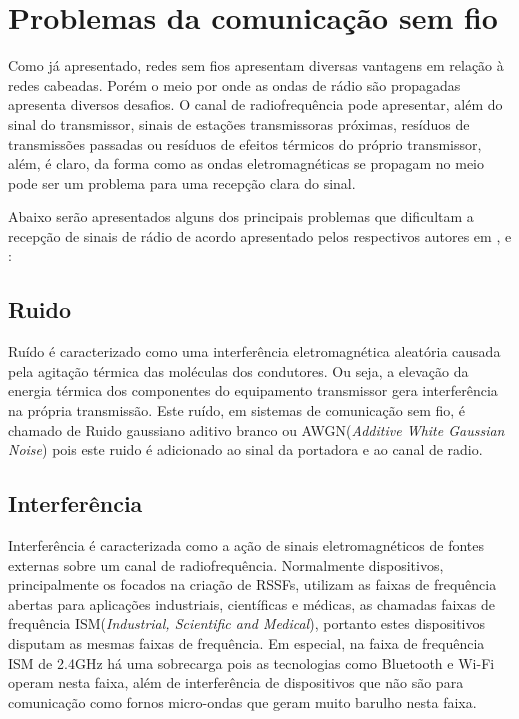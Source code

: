 \section{Problemas da comunicação sem fio}
Como já apresentado, redes sem fios apresentam diversas vantagens em relação à redes cabeadas. Porém o meio por onde as ondas de rádio são propagadas apresenta diversos desafios. O canal de radiofrequência pode apresentar, além do sinal do transmissor, sinais de estações transmissoras próximas, resíduos de transmissões passadas ou resíduos de efeitos térmicos do próprio transmissor, além, é claro, da forma como as ondas eletromagnéticas se propagam no meio pode ser um problema para uma recepção clara do sinal.

Abaixo serão apresentados alguns dos principais problemas que dificultam a recepção de sinais de rádio de acordo apresentado pelos respectivos autores em \cite{gomes2017estimaccao}, \cite{rappaport2009} e \cite{rochol2018sistemas}:
\subsection*{Ruido}
Ruído é caracterizado como uma interferência eletromagnética aleatória causada pela agitação térmica das moléculas dos condutores. Ou seja, a elevação da energia térmica dos componentes do equipamento transmissor gera interferência na própria transmissão. Este ruído, em sistemas de comunicação sem fio, é chamado de Ruido gaussiano aditivo branco ou AWGN(\emph{Additive White Gaussian Noise}) pois este ruido é adicionado ao sinal da portadora e ao canal de radio.

\subsection*{Interferência}
Interferência é caracterizada como a ação de sinais eletromagnéticos de fontes externas sobre um canal de radiofrequência. Normalmente dispositivos, principalmente os focados na criação de RSSFs, utilizam as faixas de frequência abertas para aplicações industriais, científicas e médicas, as chamadas faixas de frequência ISM(\emph{Industrial, Scientific and Medical}), portanto estes dispositivos disputam as mesmas faixas de frequência. Em especial, na faixa de frequência ISM de 2.4GHz há uma sobrecarga pois as tecnologias como Bluetooth e Wi-Fi operam nesta faixa, além de interferência de dispositivos que não são para comunicação como fornos micro-ondas que geram muito barulho nesta faixa.

